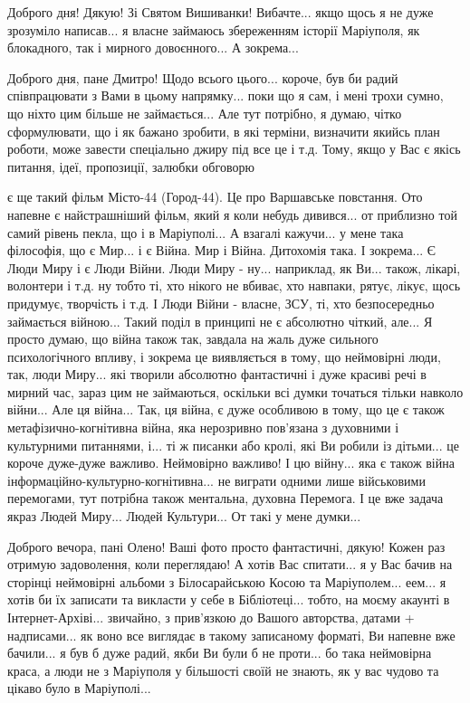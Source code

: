 Доброго дня! Дякую! Зі Святом Вишиванки! Вибачте... якщо щось я не дуже
зрозуміло написав... я власне займаюсь збереженням історії Маріуполя, як
блокадного, так і мирного довоєнного... А зокрема... 


Доброго дня, пане Дмитро! Щодо всього цього... короче, був би радий
співпрацювати з Вами в цьому напрямку... поки що я сам, і мені трохи сумно, що
ніхто цим більше не займається... Але тут потрібно, я думаю, чітко
сформулювати, що і як бажано зробити, в які терміни, визначити якийсь план роботи, може завести
спеціально джиру під все це і т.д. Тому, якщо у Вас є якісь питання, ідеї,
пропозиції, залюбки обговорю

є ще такий фільм Місто-44 (Город-44). Це про Варшавське повстання. Ото напевне
є найстрашніший фільм, який я коли небудь дивився... от приблизно той самий
рівень пекла, що і в Маріуполі... А взагалі кажучи... у мене така філософія, що
є Мир... і є Війна. Мир і Війна. Дитохомія така. І зокрема... Є Люди Миру і є
Люди Війни. Люди Миру - ну... наприклад, як Ви... також, лікарі, волонтери і
т.д. ну тобто ті, хто нікого не вбиває, хто навпаки, рятує, лікує, щось
придумує, творчість і т.д. І Люди Війни - власне, ЗСУ, ті, хто безпосередньо
займається війною... Такий поділ в принципі не є абсолютно чіткий, але... Я
просто думаю, що війна також так, завдала на жаль дуже сильного психологічного
впливу, і зокрема це виявляється в тому, що неймовірні люди, так, люди Миру...
які творили абсолютно фантастичні і дуже красиві речі в мирний час, зараз цим
не займаються, оскільки всі думки точаться тільки навколо війни... Але ця
війна... Так, ця війна, є дуже особливою в тому, що це є також
метафізично-когнітивна війна, яка нерозривно пов'язана з духовними і
культурними питаннями, і... ті ж писанки або кролі, які Ви робили із дітьми...
це короче дуже-дуже важливо. Неймовірно важливо! І цю війну... яка є також
війна інформаційно-культурно-когнітивна... не виграти одними лише військовими
перемогами, тут потрібна також ментальна, духовна Перемога. І це вже задача
якраз Людей Миру... Людей Культури... От такі у мене думки...

Доброго вечора, пані Олено! Ваші фото просто фантастичні, дякую! Кожен раз
отримую задоволення, коли переглядаю! А хотів Вас спитати... я у Вас бачив на
сторінці неймовірні альбоми з Білосарайською Косою та Маріуполем... еем... я
хотів би їх записати та викласти у себе в Бібліотеці... тобто, на моєму акаунті
в Інтернет-Архіві... звичайно, з прив'язкою до Вашого авторства, датами +
надписами... як воно все виглядає в такому записаному форматі, Ви напевне вже
бачили... я був б дуже радий, якби Ви були б не проти... бо така неймовірна
краса, а люди не з Маріуполя у більшості своїй не знають, як у вас чудово та
цікаво було в Маріуполі... 
